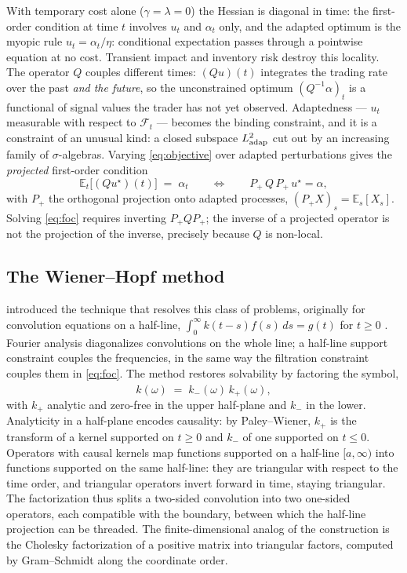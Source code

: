 \documentclass[11pt]{article}
\newcommand{\E}{\mathbb{E}}
\newcommand{\F}{\mathcal{F}}
\theoremstyle{plain}
\begin{document}
With temporary cost alone ($\gamma=\lambda=0$) the Hessian is diagonal in time: the first-order condition at time $t$ involves $u_t$ and $\alpha_t$ only, and the adapted optimum is the myopic rule $u_t = \alpha_t/\eta$: conditional expectation passes through a pointwise equation at no cost. Transient impact and inventory risk destroy this locality. The operator $Q$ couples different times: $(Qu)(t)$ integrates the trading rate over the past \emph{and the future}, so the unconstrained optimum $(Q^{-1}\alpha)_t$ is a functional of signal values the trader has not yet observed. Adaptedness --- $u_t$ measurable with respect to $\F_t$ --- becomes the binding constraint, and it is a constraint of an unusual kind: a closed subspace $L^2_{\rm adap}$ cut out by an increasing family of $\sigma$-algebras. Varying \eqref{eq:objective} over adapted perturbations gives the \emph{projected} first-order condition
\begin{equation}\label{eq:foc}
\E_t\bigl[(Qu^\star)(t)\bigr] \;=\; \alpha_t
\qquad\Longleftrightarrow\qquad
P_+\,Q\,P_+\,u^\star = \alpha,
\end{equation}
with $P_+$ the orthogonal projection onto adapted processes, $(P_+X)_s = \E_s[X_s]$. Solving \eqref{eq:foc} requires inverting $P_+QP_+$; the inverse of a projected operator is not the projection of the inverse, precisely because $Q$ is non-local.

\subsection{The Wiener--Hopf method}

\citet{WienerHopf1931} introduced the technique that resolves this class of problems, originally for convolution equations on a half-line, $\int_0^\infty k(t-s)f(s)\,ds = g(t)$ for $t\ge0$ \citep{Krein1962,Noble1958}. Fourier analysis diagonalizes convolutions on the whole line; a half-line support constraint couples the frequencies, in the same way the filtration constraint couples them in \eqref{eq:foc}. The method restores solvability by factoring the symbol,
\[
\hat k(\omega) \;=\; k_-(\omega)\,k_+(\omega),
\]
with $k_+$ analytic and zero-free in the upper half-plane and $k_-$ in the lower. Analyticity in a half-plane encodes causality: by Paley--Wiener, $k_+$ is the transform of a kernel supported on $t\ge0$ and $k_-$ of one supported on $t\le0$. Operators with causal kernels map functions supported on a half-line $[a,\infty)$ into functions supported on the same half-line: they are triangular with respect to the time order, and triangular operators invert forward in time, staying triangular. The factorization thus splits a two-sided convolution into two one-sided operators, each compatible with the boundary, between which the half-line projection can be threaded. The finite-dimensional analog of the construction is the Cholesky factorization of a positive matrix into triangular factors, computed by Gram--Schmidt along the coordinate order.
\end{document}
